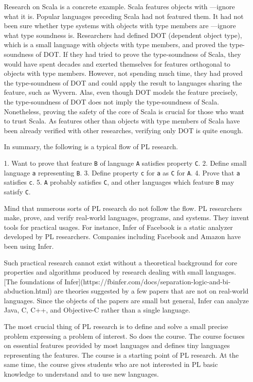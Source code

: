 Research on Scala is a concrete example. Scala features objects with ---ignore what it is. Popular languages preceding Scala had not featured
them. It had not been sure whether type systems with objects with type members
are ---ignore what type soundness is. Researchers had defined
DOT (dependent object type), which is a small language with objects with type
members, and proved the type-soundness of DOT. If they had tried to prove the
type-soundness of Scala, they would have spent decades and exerted themselves for
features orthogonal to objects with type members. However, not spending much
time, they had proved the type-soundness of DOT and could apply the result to
languages sharing the feature, such as Wyvern. Alas, even though DOT models the
feature precisely, the type-soundness of DOT does not imply the type-soundness of
Scala. Nonetheless, proving the safety of the core of Scala is crucial for those
who want to trust Scala. As features other than objects with type members of
Scala have been already verified with other researches, verifying only DOT is
quite enough.

In summary, the following is a typical flow of PL research.

1. Want to prove that feature \verb!B! of language \verb!A! satisfies property
\verb!C!.
2. Define small language \verb!a! representing \verb!B!.
3. Define property \verb!c! for \verb!a! as \verb!C! for \verb!A!.
4. Prove that \verb!a! satisfies \verb!c!.
5. \verb!A! probably satisfies \verb!C!, and other languages which feature
\verb!B! may satisfy \verb!C!.

Mind that numerous sorts of PL research do not follow the flow. PL researchers
make, prove, and verify real-world languages, programs, and systems. They invent
tools for practical usages. For instance, Infer of Facebook is a static analyzer
developed by PL researchers. Companies including Facebook and Amazon have been
using Infer.

Such practical research cannot exist without a theoretical background for core
properties and algorithms produced by research dealing with small languages. [The
foundations of
Infer](https://fbinfer.com/docs/separation-logic-and-bi-abduction.html) are
theories suggested by a few papers that are not on real-world languages. Since
the objects of the papers are small but general, Infer can analyze Java, C, C++,
and Objective-C rather than a single language.

The most crucial thing of PL research is to define and solve a small precise
problem expressing a problem of interest. So does the course. The course focuses
on essential features provided by most languages and defines tiny languages
representing the features. The course is a starting point of PL research. At the
same time, the course gives students who are not interested in PL basic knowledge
to understand and to use new languages.

